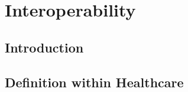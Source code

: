 \documentclass[14pt]{article}
\begin{document}
\newpage

\section{Interoperability}
\label{sec:Interoperability}

\subsection{Introduction} %

\subsection{Definition within Healthcare} %
\label{sec:interopDefinition}
\end{document}

